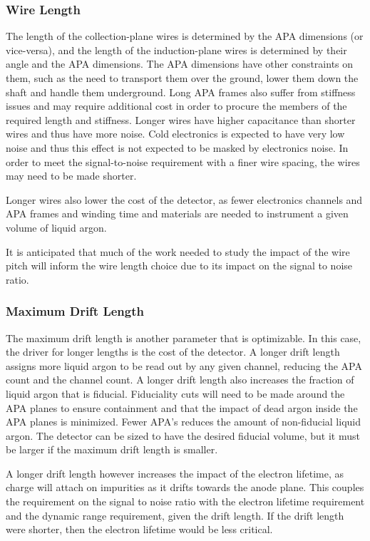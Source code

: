 \subsubsection{Wire Length}

The length of the collection-plane wires is determined by the APA dimensions (or vice-versa),
and the length of the induction-plane wires is determined by their angle and the APA
dimensions.  The APA dimensions have other constraints on them, such as the need to transport
them over the ground, lower them down the shaft and handle them underground.  Long APA frames
also suffer from stiffness issues and may require additional cost in order to procure the
members of the required length and stiffness.  Longer wires have higher capacitance than shorter
wires and thus have more noise.  Cold electronics is expected to have very low noise and thus
this effect is not expected to be masked by electronics noise.  In order to meet the signal-to-noise
requirement with a finer wire spacing, the wires may need to be made shorter.

Longer wires also lower the cost of the detector, as fewer electronics channels and APA frames
and winding time and materials are needed to instrument a given volume of liquid argon.

It is anticipated that much of the work needed to study the impact of the wire pitch will inform
the wire length choice due to its impact on the signal to noise ratio.

\subsubsection{Maximum Drift Length}

The maximum drift length is another parameter that is optimizable.  In
this case, the driver for longer lengths is the cost of the detector.
A longer drift length assigns more liquid argon to be read out by any
given channel, reducing the APA count and the channel count.  A longer
drift length also increases the fraction of liquid argon that is
fiducial.  Fiduciality cuts will need to be made around the APA planes
to ensure containment and that the impact of dead argon inside the APA
planes is minimized.  Fewer APA's reduces the amount of non-fiducial
liquid argon.  The detector can be sized to have the desired fiducial
volume, but it must be larger if the maximum drift length is smaller.

A longer drift length however increases the impact of the electron
lifetime, as charge will attach on impurities as it drifts towards the
anode plane.  This couples the requirement on the signal to noise
ratio with the electron lifetime requirement and the dynamic range
requirement, given the drift length.  If the drift length were
shorter, then the electron lifetime would be less critical.

